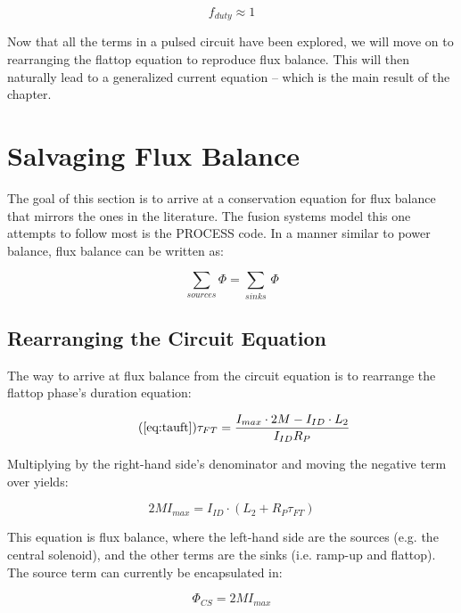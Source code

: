 \begin{equation}
	f_{duty} \approx 1
\end{equation}

Now that all the terms in a pulsed circuit have been explored, we will move on to rearranging the flattop equation to reproduce flux balance. This will then naturally lead to a generalized current equation -- which is the main result of the chapter.

\section{Salvaging Flux Balance}

The goal of this section is to arrive at a conservation equation for flux balance that mirrors the ones in the literature. The fusion systems model this one attempts to follow most is the PROCESS code.\cite{process} In a manner similar to power balance, flux balance can be written as:

\begin{equation}
	\sum_{sources} \Phi = \sum_{sinks} \, \Phi
\end{equation}

\subsection{Rearranging the Circuit Equation}

The way to arrive at flux balance from the circuit equation is to rearrange the flattop phase's duration equation:

\begin{equation}
	\tag{\ref{eq:tauft}}
	\tau_{FT} = \frac{ I_{max} \cdot 2 M - I_{ID} \cdot  L_2 }{I_{ID} R_P}
\end{equation}

Multiplying by the right-hand side's denominator and moving the negative term over yields:

\begin{equation}
	2 M I_{max} = I_{ID} \cdot \left( L_2 + R_P \tau_{FT} \right) 
\end{equation}

This equation is flux balance, where the left-hand side are the sources (e.g. the central solenoid), and the other terms are the sinks (i.e. ramp-up and flattop). The source term can currently be encapsulated in:

\begin{equation}
	\label{eq:phics}
	\Phi_{CS} = 2 M I_{max}
\end{equation}

